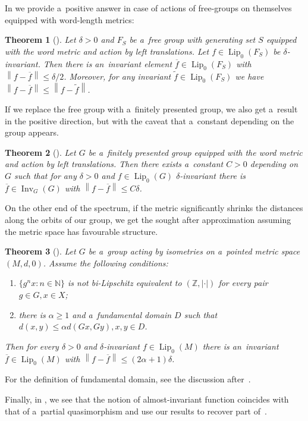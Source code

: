 \documentclass[11pt,a4paper]{amsart}
\newtheorem*{theorem*}{Theorem}
\theoremstyle{definition}
\newcommand{\Z}{\mathbb{Z}}
\newcommand{\N}{\mathbb{N}}
\newcommand{\fTilde}{\widetilde{f}}
\newcommand{\fBar}{\overline{f}}
\newcommand{\abs}[1]{\left| #1 \right|}
\newcommand{\norm}[1]{\left\| #1 \right\|}
\newcommand{\Lipz}{\operatorname{Lip}_0}
\newcommand{\inv}{\operatorname{Inv}}
\begin{document}
	In  we provide a~positive answer in case of actions of free-groups on themselves equipped with word-length metrics:
	\begin{theorem*}[]
		Let $\delta > 0$ and $F_S$ be a~free group with generating set $S$ equipped with the word metric and action by left translations. Let $f \in \Lipz(F_S)$ be $\delta$-invariant. Then there is an~invariant element $\fBar \in \Lipz(F_S)$ with $\norm{f - \fBar} \leq \delta/2$. Moreover, for any invariant $\fTilde \in \Lipz(F_S)$ we have $\norm{f-\fBar} \leq \norm{f-\fTilde}$.
	\end{theorem*}
	
	If we replace the free group with a~finitely presented group, we also get a~result in the positive direction, but with the caveat that a~constant depending on the group appears.
	\begin{theorem*} []
		Let $G$ be a~finitely presented group equipped with the word metric and action by left translations. Then there exists a~constant $C > 0$ depending on $G$ such that for any $\delta > 0$ and $f \in \Lipz(G)$ $\delta$-invariant there is $\fBar \in \inv_G(G)$ with $\norm{f - \fBar} \leq C\delta$.
	\end{theorem*}
	
	On the other end of the spectrum, if the metric significantly shrinks the distances along the orbits of our group, we get the sought after approximation assuming the metric space has favourable structure.
	\begin{theorem*} []
		Let $G$ be a~group acting by isometries on a~pointed metric space $(M, d, 0)$. Assume the following conditions:
		\begin{enumerate}
			\item $\{g^n x : n \in \N\}$ is not bi-Lipschitz equivalent to $(\Z, \abs{\cdot})$ for every pair $g \in G, x \in X$;
			\item there is $\alpha \geq 1$ and a~fundamental domain $D$ such that $d(x, y) \leq \alpha d(G x, G y), x, y \in D$.
		\end{enumerate}
		Then for every $\delta > 0$ and $\delta$-invariant $f \in \Lipz(M)$ there is an~invariant $\fBar \in \Lipz(M)$ with $\norm{f - \fBar} \leq (2\alpha + 1)\delta$.
	\end{theorem*}
	For the definition of fundamental domain, see the discussion after~.
	
	Finally, in , we see that the notion of almost-invariant function coincides with that of a~partial quasimorphism and use our results to recover part of~\cite[Theorem 1.1]{Kedra}.
	
\end{document}
